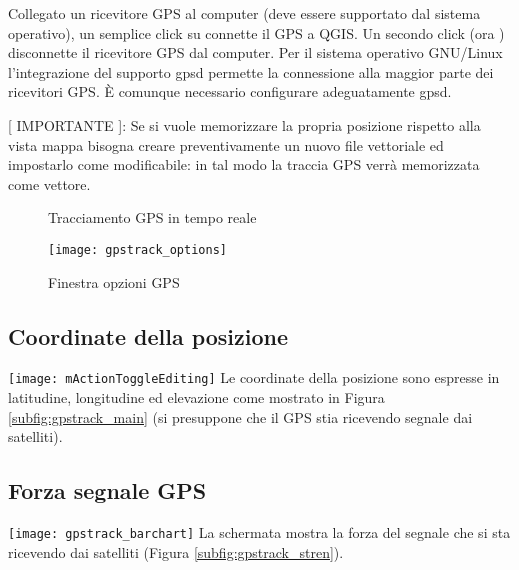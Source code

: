Collegato un ricevitore GPS al computer (deve essere supportato dal sistema operativo), un semplice click su  
connette il GPS a QGIS. Un secondo click (ora ) disconnette il ricevitore GPS dal computer.
Per il sistema operativo GNU/Linux l'integrazione del supporto gpsd permette la connessione alla maggior parte dei ricevitori
GPS. È comunque necessario configurare adeguatamente gpsd.

[ IMPORTANTE ]: Se si vuole memorizzare la propria posizione rispetto alla vista mappa bisogna creare
preventivamente un nuovo file vettoriale ed impostarlo come modificabile: in tal modo la traccia GPS verrà
memorizzata come vettore.

\begin{figure}[ht]
\centering
     \hspace{0.33cm}
     \hspace{0.33cm}
\caption{Tracciamento GPS in tempo reale \nixcaption} \label{fig:gpstrack_live}
\end{figure}

\begin{figure}[ht]
   \centering
   \texttt{[image: gpstrack\_options]}
   \caption{Finestra opzioni GPS \nixcaption}
   \label{fig:gpstrack_options}
\end{figure}

\subsection{Coordinate della posizione}
\texttt{[image: mActionToggleEditing]} Le coordinate 
della posizione sono espresse in latitudine, longitudine ed elevazione 
come mostrato in Figura \ref{subfig:gpstrack_main}
(si presuppone che il GPS stia ricevendo segnale dai satelliti). 

\subsection{Forza segnale GPS}
\texttt{[image: gpstrack\_barchart]} La schermata 
mostra la forza del segnale che si sta ricevendo dai satelliti 
(Figura \ref{subfig:gpstrack_stren}).

